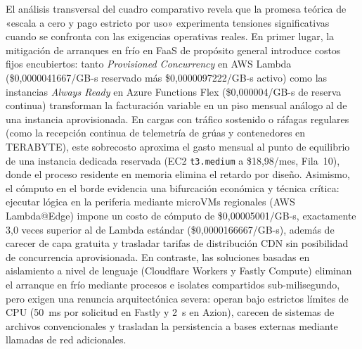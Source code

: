 \documentclass[12pt, letterpaper, table, xcdraw]{inf-pucv}
\begin{document}
El análisis transversal del cuadro comparativo revela que la promesa teórica de «escala a cero y pago estricto por uso» experimenta tensiones significativas cuando se confronta con las exigencias operativas reales. En primer lugar, la mitigación de arranques en frío en FaaS de propósito general introduce costos fijos encubiertos: tanto \emph{Provisioned Concurrency} en AWS Lambda (\$0,0000041667/GB-s reservado más \$0,0000097222/GB-s activo) como las instancias \emph{Always Ready} en Azure Functions Flex (\$0,000004/GB-s de reserva continua) transforman la facturación variable en un piso mensual análogo al de una instancia aprovisionada. En cargas con tráfico sostenido o ráfagas regulares (como la recepción continua de telemetría de grúas y contenedores en TERABYTE), este sobrecosto aproxima el gasto mensual al punto de equilibrio de una instancia dedicada reservada (EC2 \texttt{t3.medium} a \$18,98/mes, Fila~10), donde el proceso residente en memoria elimina el retardo por diseño. Asimismo, el cómputo en el borde evidencia una bifurcación económica y técnica crítica: ejecutar lógica en la periferia mediante microVMs regionales (AWS Lambda@Edge) impone un costo de cómputo de \$0,00005001/GB-s, exactamente 3,0 veces superior al de Lambda estándar (\$0,0000166667/GB-s), además de carecer de capa gratuita y trasladar tarifas de distribución CDN sin posibilidad de concurrencia aprovisionada. En contraste, las soluciones basadas en aislamiento a nivel de lenguaje (Cloudflare Workers y Fastly Compute) eliminan el arranque en frío mediante procesos e isolates compartidos sub-milisegundo, pero exigen una renuncia arquitectónica severa: operan bajo estrictos límites de CPU (50~ms por solicitud en Fastly y 2~s en Azion), carecen de sistemas de archivos convencionales y trasladan la persistencia a bases externas mediante llamadas de red adicionales.
\end{document}
